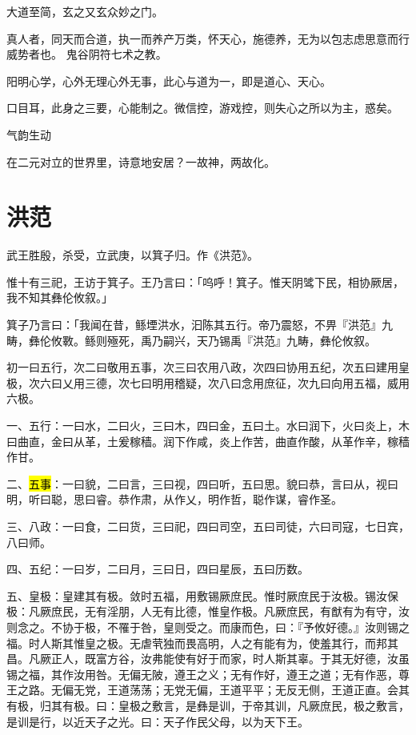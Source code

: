 大道至简，玄之又玄众妙之门。

真人者，同天而合道，执一而养产万类，怀天心，施德养，无为以包志虑思意而行威势者也。
鬼谷阴符七术之教。

阳明心学，心外无理心外无事，此心与道为一，即是道心、天心。

口目耳，此身之三要，心能制之。微信控，游戏控，则失心之所以为主，惑矣。

气韵生动

在二元对立的世界里，诗意地安居？一故神，两故化。

\section{洪范}

武王胜殷，杀受，立武庚，以箕子归。作《洪范》。

惟十有三祀，王访于箕子。王乃言曰：「呜呼！箕子。惟天阴骘下民，相协厥居，我不知其彝伦攸叙。」

箕子乃言曰：「我闻在昔，鲧堙洪水，汩陈其五行。帝乃震怒，不畀『洪范』九畴，彝伦攸斁。鲧则殛死，禹乃嗣兴，天乃锡禹『洪范』九畴，彝伦攸叙。

初一曰五行，次二曰敬用五事，次三曰农用八政，次四曰协用五纪，次五曰建用皇极，次六曰乂用三德，次七曰明用稽疑，次八曰念用庶征，次九曰向用五福，威用六极。

一、五行：一曰水，二曰火，三曰木，四曰金，五曰土。水曰润下，火曰炎上，木曰曲直，金曰从革，土爰稼穑。润下作咸，炎上作苦，曲直作酸，从革作辛，稼穑作甘。

二、\hl{五事}：一曰貌，二曰言，三曰视，四曰听，五曰思。貌曰恭，言曰从，视曰明，听曰聪，思曰睿。恭作肃，从作乂，明作哲，聪作谋，睿作圣。

三、八政：一曰食，二曰货，三曰祀，四曰司空，五曰司徒，六曰司寇，七日宾，八曰师。

四、五纪：一曰岁，二曰月，三曰日，四曰星辰，五曰历数。

五、皇极：皇建其有极。敛时五福，用敷锡厥庶民。惟时厥庶民于汝极。锡汝保极：凡厥庶民，无有淫朋，人无有比德，惟皇作极。凡厥庶民，有猷有为有守，汝则念之。不协于极，不罹于咎，皇则受之。而康而色，曰：『予攸好德。』汝则锡之福。时人斯其惟皇之极。无虐茕独而畏高明，人之有能有为，使羞其行，而邦其昌。凡厥正人，既富方谷，汝弗能使有好于而家，时人斯其辜。于其无好德，汝虽锡之福，其作汝用咎。无偏无陂，遵王之义；无有作好，遵王之道；无有作恶，尊王之路。无偏无党，王道荡荡；无党无偏，王道平平；无反无侧，王道正直。会其有极，归其有极。曰：皇极之敷言，是彝是训，于帝其训，凡厥庶民，极之敷言，是训是行，以近天子之光。曰：天子作民父母，以为天下王。

